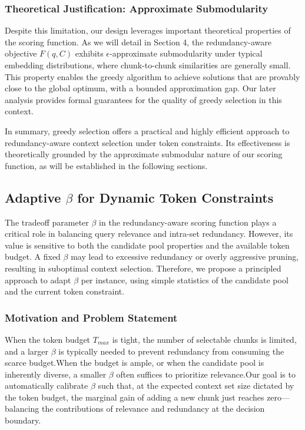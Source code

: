 \documentclass[11pt]{article}
\begin{document}
\subsubsection{Theoretical Justification: Approximate Submodularity}

Despite this limitation, our design leverages important theoretical properties of the scoring function. As we will detail in Section 4, the redundancy-aware objective $F(q, C)$ exhibits $\epsilon$-approximate submodularity under typical embedding distributions, where chunk-to-chunk similarities are generally small. This property enables the greedy algorithm to achieve solutions that are provably close to the global optimum, with a bounded approximation gap. Our later analysis provides formal guarantees for the quality of greedy selection in this context.

In summary, greedy selection offers a practical and highly efficient approach to redundancy-aware context selection under token constraints. Its effectiveness is theoretically grounded by the approximate submodular nature of our scoring function, as will be established in the following sections.


\subsection{Adaptive $\beta$ for Dynamic Token Constraints}
The tradeoff parameter $\beta$ in the redundancy-aware scoring function plays a critical role in balancing query relevance and intra-set redundancy. However, its value is sensitive to both the candidate pool properties and the available token budget. A fixed $\beta$ may lead to excessive redundancy or overly aggressive pruning, resulting in suboptimal context selection. Therefore, we propose a principled approach to adapt $\beta$ per instance, using simple statistics of the candidate pool and the current token constraint.

\subsubsection{Motivation and Problem Statement}

When the token budget $T_{max}$ is tight, the number of selectable chunks is limited, and a larger $\beta$ is typically needed to prevent redundancy from consuming the scarce budget.When the budget is ample, or when the candidate pool is inherently diverse, a smaller $\beta$ often suffices to prioritize relevance.Our goal is to automatically calibrate $\beta$ such that, at the expected context set size dictated by the token budget, the marginal gain of adding a new chunk just reaches zero—balancing the contributions of relevance and redundancy at the decision boundary.
\end{document}
